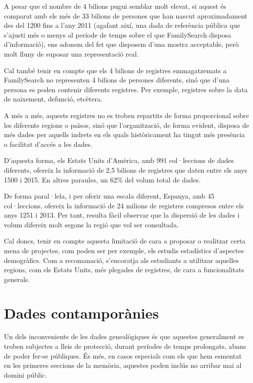     A pesar que el nombre de 4 bilions pugui semblar molt elevat, si aquest és comparat amb els més de 33 bilions de persones que han nascut aproximadament des del 1200 fins a l'any 2011 (agafant així, una dada de referència pública que s'ajusti més o menys al període de temps sobre el que FamilySearch disposa d'informació), ens adonem del fet que disposem d'una mostra acceptable, però molt lluny de suposar una representació real.

    Cal també tenir en compte que els 4 bilions de registres emmagatzemats a FamilySearch no representen 4 bilions de persones diferents, sinó que d’una persona es poden contenir diferents registres. Per exemple, registres sobre la data de naixement, defunció, etcètera.

    A més a més, aquests registres no es troben repartits de forma proporcional sobre les diferents regions o països, sinó que l'organització, de forma evident, disposa de més dades per aquells indrets en els quals històricament ha tingut més presència o facilitat d'accés a les dades.

     D'aquesta forma, els Estats Units d'Amèrica, amb 991 col·leccions de dades diferents, ofereix la informació de 2,5 bilions de registres que daten entre els anys 1500 i 2015. En altres paraules, un 62\% del volum total de dades.

     De forma paral·lela, i per oferir una escala diferent, Espanya, amb 45 col·leccions, ofereix la informació de 24 milions de registres compresos entre els anys 1251 i 2013. Per tant, resulta fàcil observar que la dispersió de les dades i volum difereix molt segons la regió que vol ser consultada.

     Cal doncs, tenir en compte aquesta limitació de cara a proposar o realitzar certa mena de projectes, com poden ser per exemple, els estudis estadístics d'aspectes demogràfics. Com a recomanació, s'encoratja als estudiants a utilitzar aquelles regions, com els Estats Units, més plegades de registres, de cara a funcionalitats generals.


 \section{Dades contamporànies}

    \paragraph{}
    Un dels inconvenients de les dades genealògiques és que aquestes generalment es troben subjectes a lleis de protecció, durant períodes de temps prolongats, abans de poder fer-se públiques. És més, en casos especials com els que hem esmentat en les primeres seccions de la memòria, aquestes poden inclús no arribar mai al domini públic.

